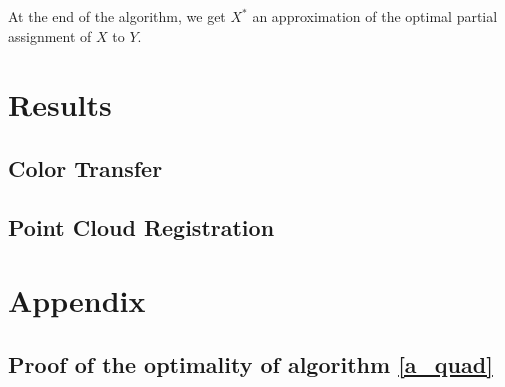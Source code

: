 \documentclass[a4paper,12pt]{article}
\begin{document}
At the end of the algorithm, we get $X^*$ an approximation of the optimal partial assignment of $X$ to $Y$.


\section{Results}

\subsection{Color Transfer}

\subsection{Point Cloud Registration}

\section{Appendix}

\subsection{Proof of the optimality of algorithm \ref{a_quad}}
\label{a_quad_proof}
\end{document}
